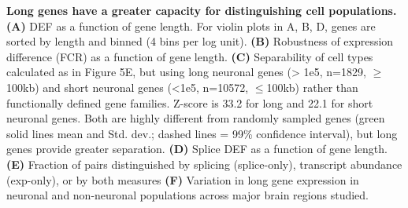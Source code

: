 \textbf{Long genes have a greater capacity for distinguishing cell populations. (A)} DEF as a function of gene length. For violin plots in A, B, D, genes are sorted by length and binned (4 bins per log unit). \textbf{(B)} Robustness of expression difference (FCR) as a function of gene length. \textbf{(C)} Separability of cell types calculated as in Figure 5E, but using long neuronal genes (> 1e5, n=1829, $\geq$100kb) and short neuronal genes (<1e5, n=10572, $\leq$100kb) rather than functionally defined gene families. Z-score is 33.2 for long and 22.1 for short neuronal genes. Both are highly different from randomly sampled genes (green solid lines mean and Std. dev.; dashed lines = 99\% confidence interval), but long genes provide greater separation. \textbf{(D)} Splice DEF as a function of gene length. \textbf{(E)} Fraction of pairs distinguished by splicing (splice-only), transcript abundance (exp-only), or by both measures \textbf{(F)} Variation in long gene expression in neuronal and non-neuronal populations across major brain regions studied.  